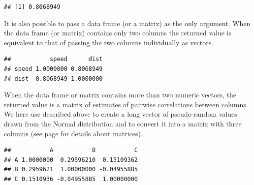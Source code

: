 \documentclass[krantz2]{krantz}\usepackage{knitr}%
\begin{document}
\begin{knitrout}\footnotesize
{}\color{fgcolor}\begin{kframe}
\begin{alltt}
\hlstd{(} \hlopt{$}  \hlopt{$}
\end{alltt}
\begin{verbatim}
## [1] 0.8068949
\end{verbatim}
\end{kframe}
\end{knitrout}

It is also possible to pass a data frame (or a matrix) as the only argument. When the data frame (or matrix) contains only two columns the returned value is equivalent to that of passing the two columns individually as vectors.

\begin{knitrout}\footnotesize
{}\color{fgcolor}\begin{kframe}
\begin{alltt}
\end{alltt}
\begin{verbatim}
##           speed      dist
## speed 1.0000000 0.8068949
## dist  0.8068949 1.0000000
\end{verbatim}
\end{kframe}
\end{knitrout}

When the data frame or matrix contains more than two numeric vectors, the returned value is a matrix of estimates of pairwise correlations between columns. We here use  described above to create a long vector of pseudo-random values drawn from the Normal distribution and  to convert it into a matrix with three columns (see page \pageref{sec:matrix:array} for details about \Rlang matrices).

\begin{knitrout}\footnotesize
{}\color{fgcolor}\begin{kframe}
\begin{alltt}
 \hlkwb{<-} \hlstd{(}\hlstd{(}\hlstd{),}  \hlstd{=} \hlstd{,}
                  \hlstd{=} \hlstd{(} \hlstd{=} \hlopt{:}\hlstd{,}  \hlstd{=} \hlstd{(}\hlstd{,} \hlstd{,} \hlstd{)))}
\end{alltt}
\begin{verbatim}
##           A           B           C
## A 1.0000000  0.29596210  0.15109362
## B 0.2959621  1.00000000 -0.04955885
## C 0.1510936 -0.04955885  1.00000000
\end{verbatim}
\end{kframe}
\end{knitrout}
\end{document}
